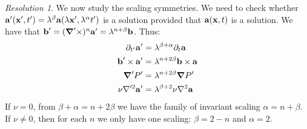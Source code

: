\documentclass[10pt,a4paper]{article}
\theoremstyle{definition}
\theoremstyle{remark}
\newtheorem*{res}{Resolution}
\begin{document}
\begin{res}
  We now study the scaling symmetries. We need to check whether $\boldsymbol{\mathrm{a}}'(\boldsymbol{\mathrm{x}}',t') = \lambda^\beta\boldsymbol{\mathrm{a}}(\lambda\boldsymbol{\mathrm{x}}',\lambda^\alpha t')$ is a solution provided that $\boldsymbol{\mathrm{a}}(\boldsymbol{\mathrm{x}},t)$ is a solution. We have that $\boldsymbol{\mathrm{b}}'=(\boldsymbol{\mathrm{\nabla}}'\times)^n\boldsymbol{\mathrm{a}}' = \lambda^{n+\beta}\boldsymbol{\mathrm{b}}$. Thus:
  \begin{align*}
    \partial_{t'}\boldsymbol{\mathrm{a}}' & = \lambda^{\beta+\alpha}\partial_t\boldsymbol{\mathrm{a}} \\
    \boldsymbol{\mathrm{b}}'\times\boldsymbol{\mathrm{a}}' & = \lambda^{n+2\beta}\boldsymbol{\mathrm{b}}\times\boldsymbol{\mathrm{a}}   \\
    \grad' P'            & = \lambda^{n+2\beta}\grad P'             \\
    \nu\nabla'^2\boldsymbol{\mathrm{a}}'  & = \lambda^{\beta+2}\nu\nabla^2\boldsymbol{\mathrm{a}}
  \end{align*}
  If $\nu=0$, from $\beta+\alpha=n+2\beta$ we have the family of invariant scaling $\alpha=n+\beta$. If $\nu\neq 0$, then for each $n$ we only have one scaling: $\beta=2-n$ and $\alpha=2$.
\end{res}
\end{document}
